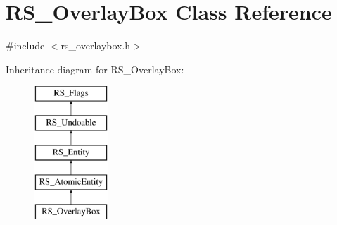 \hypertarget{classRS__OverlayBox}{\section{R\-S\-\_\-\-Overlay\-Box Class Reference}
\label{classRS__OverlayBox}
}


{\ttfamily \#include $<$rs\-\_\-overlaybox.\-h$>$}

Inheritance diagram for R\-S\-\_\-\-Overlay\-Box\-:\begin{figure}[H]
\begin{center}
\leavevmode
\includegraphics[height=5.000000cm]{classRS__OverlayBox}
\end{center}
\end{figure}
